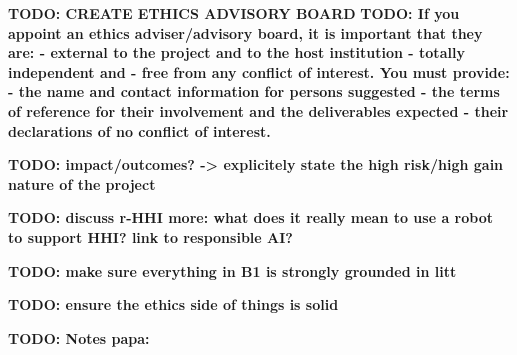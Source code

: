 \documentclass[11pt,a4paper]{report}
\newcommand{\TODO}[1]{{\color{red}\textbf{TODO: #1}}}
\begin{document}
\newcommand{\wpTwo}{Real-world Social Situation Assessment}
\newcommand{\wpTwoShort}{Social Situation Assessment}

\newcommand{\wpThree}{Goal-driven socio-cognitive architecture}
\newcommand{\wpThreeShort}{Socio-cognitive architecture}

\newcommand{\wpFour}{Data-driven social behaviour generation}
\newcommand{\wpFourShort}{Social behaviours}

\newcommand{\wpFive}{Evidence-based research: demonstrable usefulness of social robots in
real-world, complex scenarios}
\newcommand{\wpFiveShort}{Experimental deployments}







\newrefsection


\TODO{CREATE ETHICS ADVISORY BOARD}
\TODO{If you appoint an ethics adviser/advisory board, it is important that they are:
- external to the project and to the host institution
- totally independent and
- free from any conflict of interest.
    You must provide:
- the name and contact information for persons suggested
- the terms of reference for their involvement and the deliverables expected
- their declarations of no conflict of interest.}


\TODO{impact/outcomes? -> explicitely state the high risk/high gain nature of
the project}

\TODO{discuss r-HHI more: what does it really mean to use a robot to support
HHI? link to responsible AI?}

\TODO{make sure everything in B1 is strongly grounded in litt}

\TODO{ensure the ethics side of things is solid}

\TODO{Notes papa:}
\end{document}
